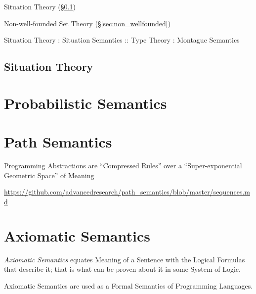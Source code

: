 Situation Theory (\S\ref{sec:situation_theory})

Non-well-founded Set Theory (\S\ref{sec:non_wellfounded})

Situation Theory : Situation Semantics
  :: Type Theory : Montague Semantics



\subsection{Situation Theory}\label{sec:situation_theory}



\section{Probabilistic Semantics}\label{sec:probabilistic_semantics}

\section{Path Semantics}\label{sec:path_semantics}

Programming Abstractions are ``Compressed Rules'' over a
``Super-exponential Geometric Space'' of Meaning

\url{https://github.com/advancedresearch/path_semantics/blob/master/sequences.md}



\section{Axiomatic Semantics}\label{sec:axiomatic_semantics}

\emph{Axiomatic Semantics} equates Meaning of a Sentence with the
Logical Formulas that describe it; that is what can be proven about it
in some System of Logic.

Axiomatic Semantics are used as a Formal Semantics of Programming
Languages.



